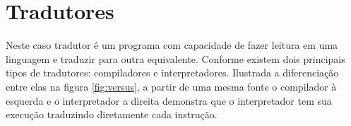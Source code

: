 


\section{Tradutores}


Neste caso tradutor é um programa com capacidade de fazer leitura em uma linguagem e traduzir para outra equivalente. Conforme  existem dois principais tipos de tradutores: compiladores e interpretadores. Ilustrada a diferenciação entre elas na figura \ref{fig:versus}, a partir de uma mesma fonte o compilador à esquerda e o interpretador a direita demonstra que o interpretador tem sua execução traduzindo diretamente cada instrução.

